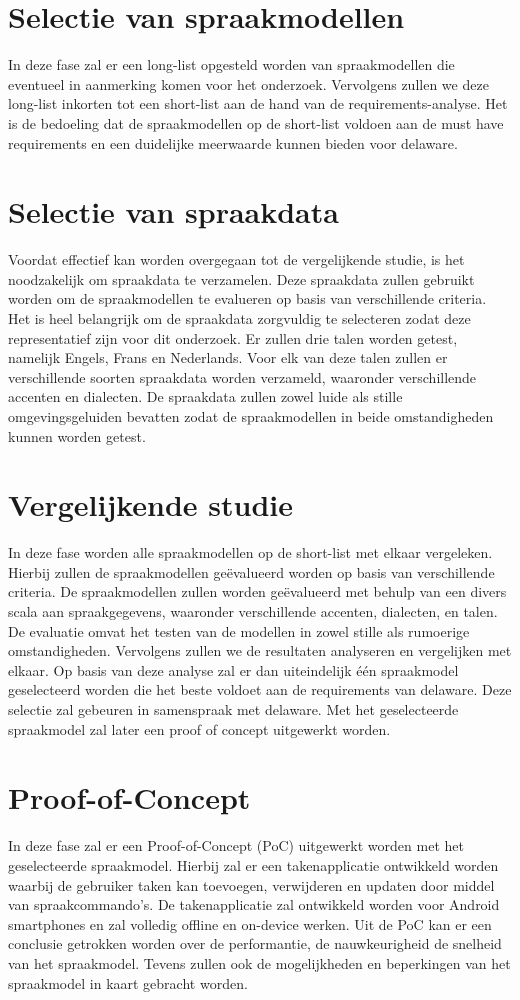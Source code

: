\section{Selectie van spraakmodellen}
In deze fase zal er een long-list opgesteld worden van spraakmodellen die eventueel in aanmerking komen voor het onderzoek. Vervolgens zullen we deze long-list inkorten tot een short-list aan de hand van de requirements-analyse. Het is de bedoeling dat de spraakmodellen op de short-list voldoen aan de must have requirements en een duidelijke meerwaarde kunnen bieden voor delaware.

\section{Selectie van spraakdata}
Voordat effectief kan worden overgegaan tot de vergelijkende studie, is het noodzakelijk om spraakdata te verzamelen. Deze spraakdata zullen gebruikt worden om de spraakmodellen te evalueren op basis van verschillende criteria. Het is heel belangrijk om de spraakdata zorgvuldig te selecteren zodat deze representatief zijn voor dit onderzoek. Er zullen drie talen worden getest, namelijk Engels, Frans en Nederlands. Voor elk van deze talen zullen er verschillende soorten spraakdata worden verzameld, waaronder verschillende accenten en dialecten. De spraakdata zullen zowel luide als stille omgevingsgeluiden bevatten zodat de spraakmodellen in beide omstandigheden kunnen worden getest.

\section{Vergelijkende studie}
In deze fase worden alle spraakmodellen op de short-list met elkaar vergeleken. Hierbij zullen de spraakmodellen geëvalueerd worden op basis van verschillende criteria. De spraakmodellen zullen worden geëvalueerd met behulp van een divers scala aan spraakgegevens, waaronder verschillende accenten, dialecten, en talen. De evaluatie omvat het testen van de modellen in zowel stille als rumoerige omstandigheden. Vervolgens zullen we de resultaten analyseren en vergelijken met elkaar. Op basis van deze analyse zal er dan uiteindelijk één spraakmodel geselecteerd worden die het beste voldoet aan de requirements van delaware. Deze selectie zal gebeuren in samenspraak met delaware. Met het geselecteerde spraakmodel zal later een proof of concept uitgewerkt worden.

\section{Proof-of-Concept}
In deze fase zal er een Proof-of-Concept (PoC) uitgewerkt worden met het geselecteerde spraakmodel. Hierbij zal er een takenapplicatie ontwikkeld worden waarbij de gebruiker taken kan toevoegen, verwijderen en updaten door middel van spraakcommando's. De takenapplicatie zal ontwikkeld worden voor Android smartphones en zal volledig offline en on-device werken. Uit de PoC kan er een conclusie getrokken worden over de performantie, de nauwkeurigheid de snelheid van het spraakmodel. Tevens zullen ook de mogelijkheden en beperkingen van het spraakmodel in kaart gebracht worden.